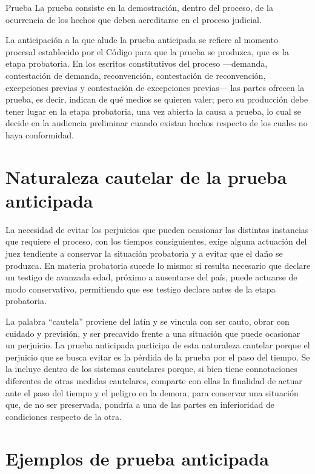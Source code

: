 \documentclass[12pt,oneside]{book}
\begin{document}
\begin{definition}{Prueba}
La prueba consiste en la demostración, dentro del proceso, de la ocurrencia de los hechos que deben acreditarse en el proceso judicial.
\end{definition}

La anticipación a la que alude la prueba anticipada se refiere al momento procesal establecido por el Código para que la prueba se produzca, que es la etapa probatoria. En los escritos constitutivos del proceso —demanda, contestación de demanda, reconvención, contestación de reconvención, excepciones previas y contestación de excepciones previas— las partes ofrecen la prueba, es decir, indican de qué medios se quieren valer; pero su producción debe tener lugar en la etapa probatoria, una vez abierta la causa a prueba, lo cual se decide en la audiencia preliminar cuando existan hechos respecto de los cuales no haya conformidad.

\section{Naturaleza cautelar de la prueba anticipada}

La necesidad de evitar los perjuicios que pueden ocasionar las distintas instancias que requiere el proceso, con los tiempos consiguientes, exige alguna actuación del juez tendiente a conservar la situación probatoria y a evitar que el daño se produzca. En materia probatoria sucede lo mismo: si resulta necesario que declare un testigo de avanzada edad, próximo a ausentarse del país, puede actuarse de modo conservativo, permitiendo que ese testigo declare antes de la etapa probatoria.

\begin{note}
La palabra ``cautela'' proviene del latín y se vincula con ser cauto, obrar con cuidado y previsión, y ser precavido frente a una situación que puede ocasionar un perjuicio. La prueba anticipada participa de esta naturaleza cautelar porque el perjuicio que se busca evitar es la pérdida de la prueba por el paso del tiempo. Se la incluye dentro de los sistemas cautelares porque, si bien tiene connotaciones diferentes de otras medidas cautelares, comparte con ellas la finalidad de actuar ante el paso del tiempo y el peligro en la demora, para conservar una situación que, de no ser preservada, pondría a una de las partes en inferioridad de condiciones respecto de la otra.
\end{note}

\section{Ejemplos de prueba anticipada}
\end{document}
